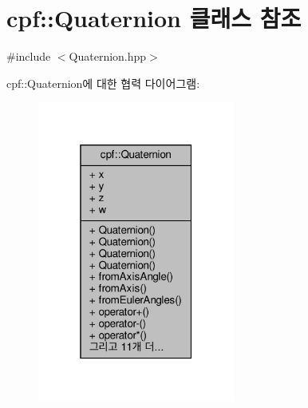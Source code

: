 \hypertarget{classcpf_1_1_quaternion}{}\section{cpf\+:\+:Quaternion 클래스 참조}
\label{classcpf_1_1_quaternion}


{\ttfamily \#include $<$Quaternion.\+hpp$>$}



cpf\+:\+:Quaternion에 대한 협력 다이어그램\+:
\nopagebreak
\begin{figure}[H]
\begin{center}
\leavevmode
\includegraphics[width=184pt]{classcpf_1_1_quaternion__coll__graph}
\end{center}
\end{figure}
